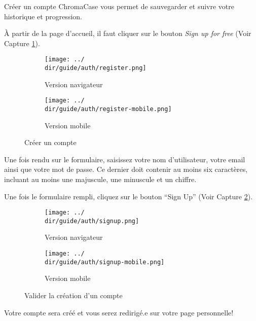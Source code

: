 Créer un compte ChromaCase vous permet de sauvegarder et suivre votre historique et progression.

À partir de la page d’accueil, il faut cliquer sur le bouton \textit{Sign up for free} (Voir Capture \ref{fig:signup}).

\begin{figure}[H]
	\begin{subfigure}[b]{0.7\textwidth}
		\texttt{[image: ../\\dir/guide/auth/register.png]}
		\caption{Version navigateur}
	\end{subfigure}
	\begin{subfigure}[b]{0.25\textwidth}
		\texttt{[image: ../\\dir/guide/auth/register-mobile.png]}
		\caption{Version mobile}
	\end{subfigure}
	\caption{Créer un compte}
	\label{fig:signup}
\end{figure}

Une fois rendu sur le formulaire, saisissez votre nom d’utilisateur, votre email ainsi que votre mot de passe.
Ce dernier doit contenir au moins six caractères, incluant au moins une majuscule, une minuscule et un chiffre.

Une fois le formulaire rempli, cliquez sur le bouton “Sign Up” (Voir Capture \ref{fig:signup-form}).

\begin{figure}[H]
	\begin{center}
		\begin{subfigure}[b]{0.7\textwidth}
			\texttt{[image: ../\\dir/guide/auth/signup.png]}
			\caption{Version navigateur}
		\end{subfigure}
		\begin{subfigure}[b]{0.25\textwidth}
			\texttt{[image: ../\\dir/guide/auth/signup-mobile.png]}
			\caption{Version mobile}
		\end{subfigure}
		\caption{Valider la création d'un compte}
		\label{fig:signup-form}
	\end{center}
\end{figure}

Votre compte sera créé et vous serez redirigé.e sur votre page personnelle!